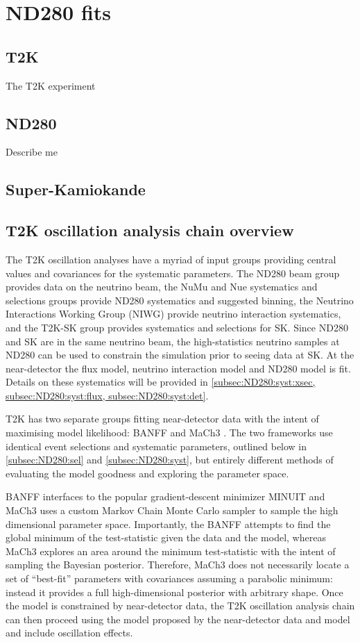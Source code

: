 \chapter{ND280 fits}
\label{chap:ND280}

\section{T2K}
The T2K experiment

\section{ND280}
Describe me

\section{Super-Kamiokande}

\section{T2K oscillation analysis chain overview}
The T2K oscillation analyses have a myriad of input groups providing central values and covariances for the systematic parameters. The ND280 beam group provides data on the neutrino beam, the NuMu and Nue systematics and selections groups provide ND280 systematics and suggested binning, the Neutrino Interactions Working Group (NIWG) provide neutrino interaction systematics, and the T2K-SK group provides systematics and selections for SK. Since ND280 and SK are in the same neutrino beam, the high-statistics neutrino samples at ND280 can be used to constrain the simulation prior to seeing data at SK. At the near-detector the flux model, neutrino interaction model and ND280 model is fit. Details on these systematics will be provided in \autoref{subsec:ND280:syst:xsec, subsec:ND280:syst:flux, subsec:ND280:syst:det}. 

T2K has two separate groups fitting near-detector data with the intent of maximising model likelihood: BANFF  and MaCh3 . The two frameworks use identical event selections and systematic parameters, outlined below in \autoref{subsec:ND280:sel} and \autoref{subsec:ND280:syst}, but entirely different methods of evaluating the model goodness and exploring the parameter space.

BANFF interfaces to the popular gradient-descent minimizer MINUIT  and MaCh3 uses a custom Markov Chain Monte Carlo sampler to sample the high dimensional parameter space. Importantly, the BANFF attempts to find the global minimum of the test-statistic given the data and the model, whereas MaCh3 explores an area around the minimum test-statistic with the intent of sampling the Bayesian posterior. Therefore, MaCh3 does not necessarily locate a set of ``best-fit'' parameters with covariances assuming a parabolic minimum: instead it provides a full high-dimensional posterior with arbitrary shape. Once the model is constrained by near-detector data, the T2K oscillation analysis chain can then proceed using the model proposed by the near-detector data and model and include oscillation effects.

